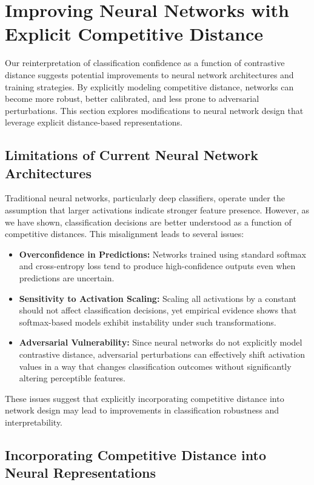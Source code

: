 \section{Improving Neural Networks with Explicit Competitive Distance}

Our reinterpretation of classification confidence as a function of contrastive distance suggests potential improvements to neural network architectures and training strategies. By explicitly modeling competitive distance, networks can become more robust, better calibrated, and less prone to adversarial perturbations. This section explores modifications to neural network design that leverage explicit distance-based representations.

\subsection{Limitations of Current Neural Network Architectures}

Traditional neural networks, particularly deep classifiers, operate under the assumption that larger activations indicate stronger feature presence. However, as we have shown, classification decisions are better understood as a function of competitive distances. This misalignment leads to several issues:

\begin{itemize}
    \item \textbf{Overconfidence in Predictions:} Networks trained using standard softmax and cross-entropy loss tend to produce high-confidence outputs even when predictions are uncertain.
    \item \textbf{Sensitivity to Activation Scaling:} Scaling all activations by a constant should not affect classification decisions, yet empirical evidence shows that softmax-based models exhibit instability under such transformations.
    \item \textbf{Adversarial Vulnerability:} Since neural networks do not explicitly model contrastive distance, adversarial perturbations can effectively shift activation values in a way that changes classification outcomes without significantly altering perceptible features.
\end{itemize}

These issues suggest that explicitly incorporating competitive distance into network design may lead to improvements in classification robustness and interpretability.

\subsection{Incorporating Competitive Distance into Neural Representations}

